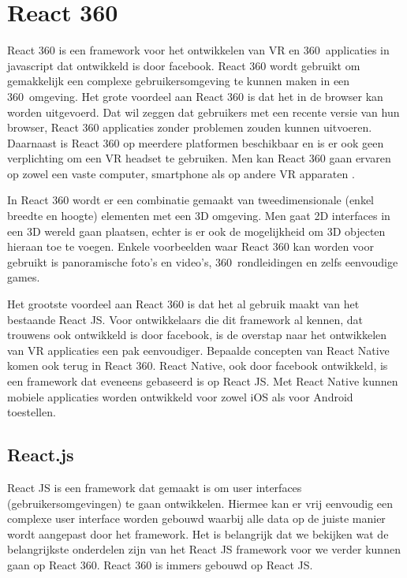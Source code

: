 \chapter{React 360}
\label{ch:react-360}

React 360 is een framework voor het ontwikkelen van VR en 360\textdegree\ applicaties in javascript dat ontwikkeld is door facebook. React 360 wordt gebruikt om gemakkelijk een complexe gebruikersomgeving te kunnen maken in een 360\textdegree\ omgeving. Het grote voordeel aan React 360 is dat het in de browser kan worden uitgevoerd. Dat wil zeggen dat gebruikers met een recente versie van hun browser, React 360 applicaties zonder problemen zouden kunnen uitvoeren. Daarnaast is React 360 op meerdere platformen beschikbaar en is er ook geen verplichting om een VR headset te gebruiken. Men kan React 360 gaan ervaren op zowel een vaste computer, smartphone als op andere VR apparaten \autocite{Lehr2017}.

In React 360 wordt er een combinatie gemaakt van tweedimensionale (enkel breedte en hoogte) elementen met een 3D omgeving. Men gaat 2D interfaces in een 3D wereld gaan plaatsen, echter is er ook de mogelijkheid om 3D objecten hieraan toe te voegen. Enkele voorbeelden waar React 360 kan worden voor gebruikt is panoramische foto's en video’s, 360\textdegree\ rondleidingen en zelfs eenvoudige games.

Het grootste voordeel aan React 360 is dat het al gebruik maakt van het bestaande React JS. Voor ontwikkelaars die dit framework al kennen, dat trouwens ook ontwikkeld is door facebook, is de overstap naar het ontwikkelen van VR applicaties een pak eenvoudiger. Bepaalde concepten van React Native komen ook terug in React 360. React Native, ook door facebook ontwikkeld, is een framework dat eveneens gebaseerd is op React JS. Met React Native kunnen mobiele applicaties worden ontwikkeld voor zowel iOS als voor Android toestellen.

\section{React.js}
\label{sec:reactjs}
React JS is een framework dat gemaakt is om user interfaces (gebruikersomgevingen) te gaan ontwikkelen. Hiermee kan er vrij eenvoudig een complexe user interface worden gebouwd waarbij alle data op de juiste manier wordt aangepast door het framework. Het is belangrijk dat we bekijken wat de belangrijkste onderdelen zijn van het React JS framework voor we verder kunnen gaan op React 360. React 360 is immers gebouwd op React JS.

